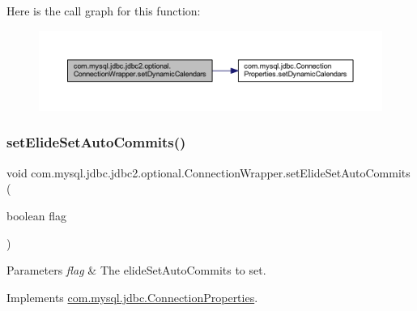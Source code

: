 Here is the call graph for this function\+:
\nopagebreak
\begin{figure}[H]
\begin{center}
\leavevmode
\includegraphics[width=350pt]{classcom_1_1mysql_1_1jdbc_1_1jdbc2_1_1optional_1_1_connection_wrapper_a0f42541efa793fe1588d0807c2ffab92_cgraph}
\end{center}
\end{figure}
\mbox{\label{classcom_1_1mysql_1_1jdbc_1_1jdbc2_1_1optional_1_1_connection_wrapper_ae265f34efd113d6df170b5354eb960f0}} 
\subsubsection{\texorpdfstring{set\+Elide\+Set\+Auto\+Commits()}{setElideSetAutoCommits()}}
{\footnotesize\ttfamily void com.\+mysql.\+jdbc.\+jdbc2.\+optional.\+Connection\+Wrapper.\+set\+Elide\+Set\+Auto\+Commits (\begin{DoxyParamCaption}\item[{boolean}]{flag }\end{DoxyParamCaption})}


\begin{DoxyParams}{Parameters}
{\em flag} & The elide\+Set\+Auto\+Commits to set. \\
\hline
\end{DoxyParams}


Implements \mbox{\hyperlink{interfacecom_1_1mysql_1_1jdbc_1_1_connection_properties_ae95924c9d1da3b93b44b58b33089d251}{com.\+mysql.\+jdbc.\+Connection\+Properties}}.

